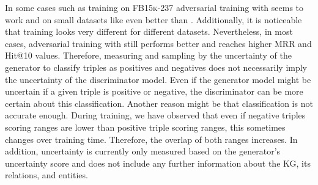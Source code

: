 





In some cases such as training on \textsc{FB15k-237} adversarial training with \ussoftmax seems to work and on small datasets like \umls even better than \origsampling.
Additionally, it is noticeable that training looks very different for different datasets.
Nevertheless, in most cases, adversarial training with \origsampling still performs better and reaches higher MRR and Hit@10 values.
Therefore, measuring and sampling by the uncertainty of the generator to classify triples as positives and negatives does not necessarily imply the uncertainty of the discriminator model.
Even if the generator model might be uncertain if a given triple is positive or negative, the discriminator can be more certain about this classification.
Another reason might be that classification is not accurate enough.
During training, we have observed that even if negative triples scoring ranges are lower than positive triple scoring ranges, this sometimes changes over training time.
Therefore, the overlap of both ranges increases.
In addition, uncertainty is currently only measured based on the generator's uncertainty score and does not include any further information about the \ac{KG}, its relations, and entities.


